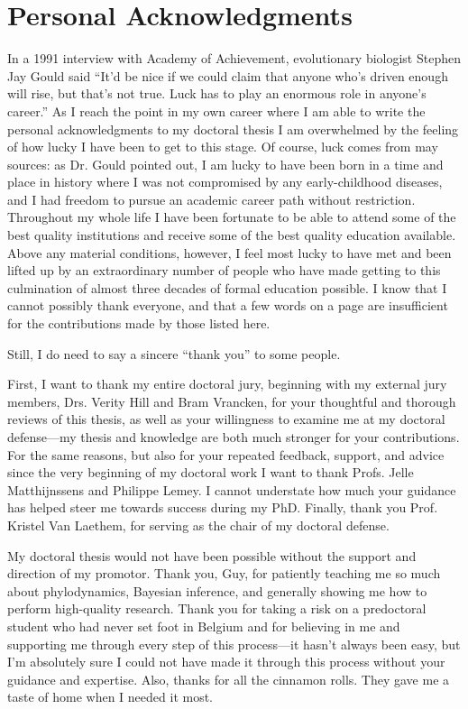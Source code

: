 \chapter*{Personal Acknowledgments}                                  \label{ch:preface}

In a 1991 interview with Academy of Achievement, evolutionary biologist Stephen Jay Gould said ``It'd be nice if we could claim that anyone who's driven enough will rise, but that's not true. Luck has to play an enormous role in anyone's career.''
As I reach the point in my own career where I am able to write the personal acknowledgments to my doctoral thesis I am overwhelmed by the feeling of how lucky I have been to get to this stage.
Of course, luck comes from may sources: as Dr. Gould pointed out, I am lucky to have been born in a time and place in history where I was not compromised by any early-childhood diseases, and I had freedom to pursue an academic career path without restriction.
Throughout my whole life I have been fortunate to be able to attend some of the best quality institutions and receive some of the best quality education available.
Above any material conditions, however, I feel most lucky to have met and been lifted up by an extraordinary number of people who have made getting to this culmination of almost three decades of formal education possible.
I know that I cannot possibly thank everyone, and that a few words on a page are insufficient for the contributions made by those listed here.

Still, I do need to say a sincere ``thank you'' to some people.

First, I want to thank my entire doctoral jury, beginning with my external jury members, Drs. Verity Hill and Bram Vrancken, for your thoughtful and thorough reviews of this thesis, as well as your willingness to examine me at my doctoral defense---my thesis and knowledge are both much stronger for your contributions.
For the same reasons, but also for your repeated feedback, support, and advice since the very beginning of my doctoral work I want to thank Profs. Jelle Matthijnssens and Philippe Lemey.
I cannot understate how much your guidance has helped steer me towards success during my PhD.
Finally, thank you Prof. Kristel Van Laethem, for serving as the chair of my doctoral defense.

My doctoral thesis would not have been possible without the support and direction of my promotor.
Thank you, Guy, for patiently teaching me so much about phylodynamics, Bayesian inference, and generally showing me how to perform high-quality research.
Thank you for taking a risk on a predoctoral student who had never set foot in Belgium and for believing in me and supporting me through every step of this process---it hasn't always been easy, but I'm absolutely sure I could not have made it through this process without your guidance and expertise.
Also, thanks for all the cinnamon rolls.
They gave me a taste of home when I needed it most.

